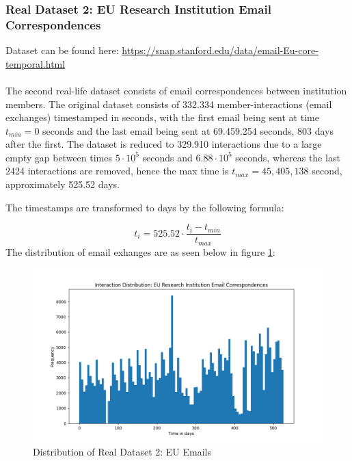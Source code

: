 \subsubsection{Real Dataset 2: EU Research Institution Email Correspondences}
\label{sec:Data:RealData:RealDataset2}
Dataset can be found here: \href{https://snap.stanford.edu/data/email-Eu-core-temporal.html}{https://snap.stanford.edu/data/email-Eu-core-temporal.html}
\\\\
The second real-life dataset consists of email correspondences between institution members.
The original dataset consists of 332.334 member-interactions (email exchanges) timestamped in seconds, with the first email being sent at time $t_{min} = 0$ seconds and the last email being sent at 69.459.254 seconds, 803 days after the first.
The dataset is reduced to 329.910 interactions due to a large empty gap between times $5 \cdot 10^5$ seconds and $6.88 \cdot 10^5$ seconds, whereas the last 2424 interactions are removed, hence the max time is $t_{max} = 45,405,138$ second, approximately 525.52 days.

The timestamps are transformed to days by the following formula:

\begin{equation}
    t_i = 525.52 \cdot \frac{t_i - t_{min}}{t_{max}}
\end{equation}
The distribution of email exhanges are as seen below in figure \ref{fig:RLdataset2}:

\begin{figure}[H]
    \centering
    \includegraphics[width=\textwidth]{0_images/reallife_dataset_2_dist.png}
    \caption{Distribution of Real Dataset 2: EU Emails}
    \label{fig:RLdataset2}
\end{figure}


